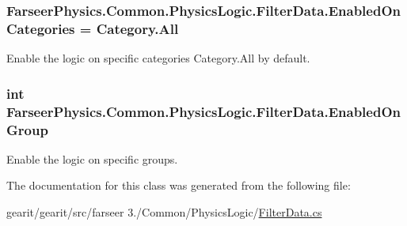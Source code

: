 \hypertarget{class_farseer_physics_1_1_common_1_1_physics_logic_1_1_filter_data_a087e65e175df45d7642ab40569f74e3f}{
\subsubsection[{Enabled\+On\+Categories}]{ Farseer\+Physics.\+Common.\+Physics\+Logic.\+Filter\+Data.\+Enabled\+On\+Categories = Category.\+All}}\label{class_farseer_physics_1_1_common_1_1_physics_logic_1_1_filter_data_a087e65e175df45d7642ab40569f74e3f}


Enable the logic on specific categories Category.\+All by default. 

\hypertarget{class_farseer_physics_1_1_common_1_1_physics_logic_1_1_filter_data_a36a8f83ec200dbac9fc42c59cabe1726}{
\subsubsection[{Enabled\+On\+Group}]{\setlength{\rightskip}{0pt plus 5cm}int Farseer\+Physics.\+Common.\+Physics\+Logic.\+Filter\+Data.\+Enabled\+On\+Group}}\label{class_farseer_physics_1_1_common_1_1_physics_logic_1_1_filter_data_a36a8f83ec200dbac9fc42c59cabe1726}


Enable the logic on specific groups. 



The documentation for this class was generated from the following file\+:\begin{DoxyCompactItemize}
\item 
gearit/gearit/src/farseer 3./\+Common/\+Physics\+Logic/\hyperlink{_filter_data_8cs}{Filter\+Data.\+cs}\end{DoxyCompactItemize}
